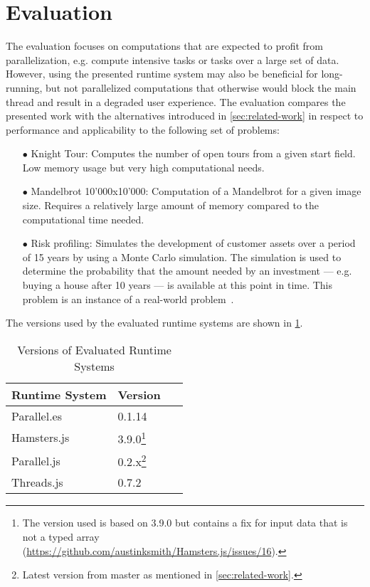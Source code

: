 \section{Evaluation}\label{sec:evaluation}
The evaluation focuses on computations that are expected to profit from parallelization, e.g. compute intensive tasks or tasks over a large set of data. However, using the presented runtime system may also be beneficial for long-running, but not parallelized computations that otherwise would block the main thread and result in a degraded user experience. The evaluation compares the presented work with the alternatives introduced in \cref{sec:related-work} in respect to performance and applicability to the following set of problems:

\begin{itemize}
	\item[$\bullet$] Knight Tour: Computes the number of open tours from a given start field. Low memory usage but very high computational needs.
	\item[$\bullet$] Mandelbrot 10'000x10'000: Computation of a Mandelbrot for a given image size. Requires a relatively large amount of memory compared to the computational time needed.
	\item[$\bullet$] Risk profiling: Simulates the development of customer assets over a period of 15 years by using a Monte Carlo simulation. The simulation is used to determine the probability that the amount needed by an investment --- e.g. buying a house after 10 years --- is available at this point in time. This problem is an instance of a real-world problem~\cite{Kwsoft2016}.
\end{itemize}

The versions used by the evaluated runtime systems are shown in \cref{tab:runtime-system-version}.

\begin{table}
	\centering
	\begin{tabular}{p{0.6\linewidth} l}
		\toprule
		Runtime System & Version \\ \midrule
		Parallel.es & 0.1.14 \\
		Hamsters.js & 3.9.0\footnote{The version used is based on 3.9.0 but contains a fix for input data that is not a typed array (\url{https://github.com/austinksmith/Hamsters.js/issues/16}).} \\
		Parallel.js & 0.2.x\footnote{Latest version from master as mentioned in \cref{sec:related-work}.} \\
		Threads.js & 0.7.2 \\ \bottomrule
	\end{tabular}
	\caption{Versions of Evaluated Runtime Systems}
	\label{tab:runtime-system-version}
\end{table}


